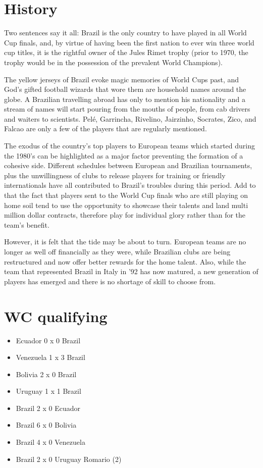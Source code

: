 \section{History}
Two sentences say it all: Brazil is the only country to have played in all 
World Cup finals, and, by virtue of having been the first nation to ever win 
three world cup titles, it is the rightful owner of the Jules Rimet trophy 
(prior to 1970, the trophy would be in the possession of the prevalent World 
Champions).

The yellow jerseys of Brazil evoke magic memories of World Cups past, and God's
gifted football wizards that wore them are household names around the globe. A 
Brazilian travelling abroad has only to mention his nationality and a stream of 
names will start pouring from the mouths of people, from cab drivers and 
waiters to scientists.  Pel{\'e}, Garrincha, Rivelino, Jairzinho, Socrates, Zico, 
and Falcao are only a few of the players that are regularly mentioned.

The exodus of the country's top players to European teams which started during
the 1980's can be highlighted as a major factor preventing the formation of a 
cohesive side.  Different schedules between European and Brazilian tournaments,
plus the unwillingness of clubs to release players for training or friendly 
internationals have all contributed to Brazil's troubles during this period. 
Add to that the fact that players sent to the World Cup finals who are still 
playing on home soil tend to use the opportunity to showcase their talents and 
land multi million dollar contracts, therefore play for individual glory rather 
than for the team's benefit.

However, it is felt that the tide may be about to turn. European teams are no 
longer as well off financially as they were, while Brazilian clubs are being 
restructured and now offer better rewards for the home talent. Also, while the 
team that represented Brazil in Italy in '92 has now matured, a new generation 
of players has emerged and there is no shortage of skill to choose from.

\section{WC qualifying}
\begin{itemize}
\item Ecuador 0 x 0   Brazil
\item Venezuela 1 x 3 Brazil
\item Bolivia 2 x 0   Brazil
\item Uruguay 1 x 1   Brazil
\item Brazil  2 x 0   Ecuador
\item Brazil  6 x 0   Bolivia
\item Brazil  4 x 0   Venezuela
\item Brazil  2 x 0   Uruguay Rom{\’a}rio (2)
\end{itemize}
